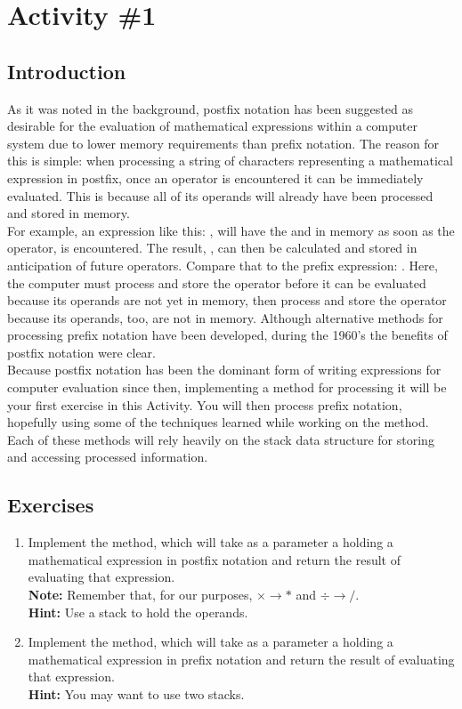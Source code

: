 	\pagebreak

	\section{Activity \#1}
		\subsection{Introduction}
			As it was noted in the background, postfix notation has been suggested as desirable for the evaluation of mathematical expressions within a computer system due to lower memory requirements than prefix notation. The reason for this is simple: when processing a string of characters representing a mathematical expression in postfix, once an operator is encountered it can be immediately evaluated. This is because all of its operands will already have been processed and stored in memory.\\[\baselineskip]
			For example, an expression like this: , will have the  and  in memory as soon as the operator, \code{+} is encountered. The result, , can then be calculated and stored in anticipation of future operators. Compare that to the prefix expression: . Here, the computer must process and store the \code{-} operator before it can be evaluated because its operands are not yet in memory, then process and store the \code{+} operator because its operands, too, are not in memory. Although alternative methods for processing prefix notation have been developed, during the 1960's the benefits of postfix notation were clear.\\[\baselineskip]
			Because postfix notation has been the dominant form of writing expressions for computer evaluation since then, implementing a method for processing it will be your first exercise in this Activity. You will then process prefix notation, hopefully using some of the techniques learned while working on the  method. Each of these methods will rely heavily on the stack data structure for storing and accessing processed information.

		\subsection{Exercises}
			\begin{enumerate}
				\item Implement the  method, which will take as a parameter a  holding a mathematical expression in postfix notation and return the result of evaluating that expression.\\
				{\small\textbf{Note:} Remember that, for our purposes, $\times \to *$ and $\div \to /$.}\\
				{\small\textbf{Hint:} Use a stack to hold the operands.}
				\item Implement the  method, which will take as a parameter a  holding a mathematical expression in prefix notation and return the result of evaluating that expression.\\
				{\small\textbf{Hint:} You may want to use two stacks.}
			\end{enumerate}

